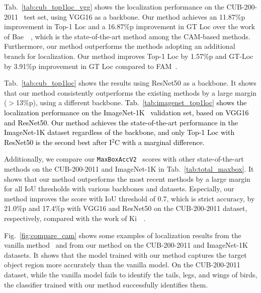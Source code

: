 Tab.~\ref{tab:cub_top1loc_vgg} shows the localization performance on the CUB-200-2011~\cite{welinder2010caltech} test set, using VGG16 as a backbone. Our method achieves an 11.87\%p improvement in Top-1 Loc and a 16.87\%p improvement in GT Loc over the work of Bae~\etal~\cite{bae2020rethinking}, which is the state-of-the-art method among the CAM-based methods.
Furthermore, our method outperforms the methods adopting an additional branch for localization. Our method improves Top-1 Loc by 1.57\%p and GT-Loc by 3.91\%p improvement in GT Loc compared to FAM~\cite{meng2021foreground}.

Tab.~\ref{tab:cub_top1loc} shows the results using ResNet50 as a backbone. It shows that our method consistently outperforms the existing methods by a large margin ($>$13\%p), using a different backbone.
\textcolor{black}{Tab.~\ref{tab:imagenet_top1loc} shows the localization performance on the ImageNet-1K~\cite{russakovsky2015imagenet} validation set, based on VGG16 and ResNet50.
Our method achieves the state-of-the-art performance in the ImageNet-1K dataset regardless of the backbone, and only Top-1 Loc with ResNet50 is the second best after I$^2$C with a marginal difference.}

Additionally, we compare our \texttt{MaxBoxAccV2}~\cite{choe2020evaluation} scores with other state-of-the-art methods on the CUB-200-2011 and ImageNet-1K in Tab.~\ref{tab:total_maxbox}.
It shows that our method outperforms the most recent methods by a large margin for all IoU thresholds with various backbones and datasets. Especially, our method improves the score with IoU threshold of 0.7, which is strict accuracy, by 21.0\%p and 17.4\%p with VGG16 and ResNet50 on the CUB-200-2011 dataset, respectively, compared with the work of Ki~\etal~\cite{ki2020sample}.



Fig.~\ref{fig:compare_cam} shows some examples of localization results from the vanilla method~\cite{zhou2016learning} and from our method on the CUB-200-2011 and ImageNet-1K datasets. It shows that the model trained with our method captures the target object region more accurately than the vanilla model. On the CUB-200-2011 dataset, while the vanilla model fails to identify the tails, legs, and wings of birds, the classifier trained with our method successfully identifies them.





